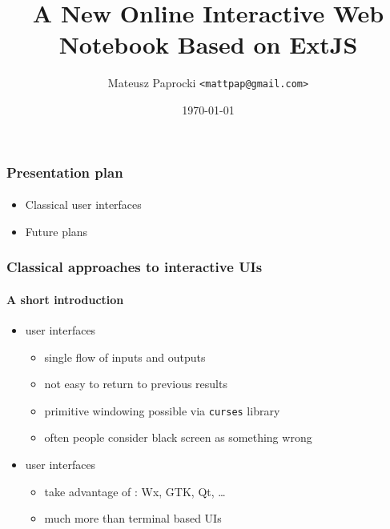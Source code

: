 \documentclass{beamer}
\title{A New Online Interactive Web Notebook Based on ExtJS}
\author{Mateusz Paprocki \texttt{<mattpap@gmail.com>}}
\institute[PWR]{Wrocław University of Technology \newline University of Nevada, Reno}
\date{\today}
\begin{document}
\frame{\titlepage}

\begin{frame}
    \frametitle{Presentation plan}
    \framesubtitle{}

    \begin{itemize}
        \item Classical user interfaces
        \pause
        \item Future plans
    \end{itemize}
\end{frame}

%
%

\begin{frame}
    \frametitle{Classical approaches to interactive UIs}
    \framesubtitle{A short introduction}

    \begin{itemize}
        \item {} user interfaces
            \begin{itemize}
                \item single flow of inputs and outputs
                \item not easy to return to previous results
                \item primitive windowing possible via \texttt{curses} library
                \item often people consider black screen as something wrong
            \end{itemize}
        \item {} user interfaces
            \begin{itemize}
                \item take advantage of : Wx, GTK, Qt, \ldots
                \item much more  than terminal based UIs
            \end{itemize}
    \end{itemize}
\end{frame}
\end{document}
